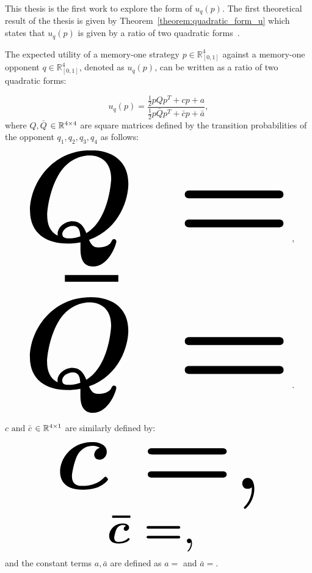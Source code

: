 This thesis is the first work to explore the form of \(u_q(p)\). The first
theoretical result of the thesis is given by
Theorem~\ref{theorem:quadratic_form_u} which states that \(u_q(p)\) is given by
a ratio of two quadratic forms~\cite{kepner2011}.

\begin{theorem}\label{theorem:quadratic_form_u}
    The expected utility of a memory-one strategy \(p\in\mathbb{R}_{[0,1]}^4\)
    against a memory-one opponent \(q\in\mathbb{R}_{[0,1]}^4\), denoted
    as \(u_q(p)\), can be written as a ratio of two quadratic forms:

    \begin{equation}\label{eq:optimisation_quadratic}
    u_q(p) = \frac{\frac{1}{2}pQp^T + cp + a}
                {\frac{1}{2}p\bar{Q}p^T + \bar{c}p + \bar{a}},
    \end{equation}
    where \(Q, \bar{Q}\) \(\in \mathbb{R}^{4\times4}\) are square matrices defined by the
    transition probabilities of the opponent \(q_1, q_2, q_3, q_4\) as follows:

    \begin{center}
    \begin{equation}
    \resizebox{0.91\linewidth}{!}{\arraycolsep=2.5pt%
    \boldmath\(
    Q = \)},
    \end{equation}
    \begin{equation}\label{eq:q_bar_matrix}
    \resizebox{0.91\linewidth}{!}{\arraycolsep=2.5pt%
    \boldmath\(
    \bar{Q} =  \)}.
    \end{equation}
    \end{center}

    \(c \text{ and } \bar{c}\) \(\in \mathbb{R}^{4 \times 1}\) are similarly defined by:

    \begin{equation}\label{eq:q_matrix_numerator}
    \resizebox{0.70\linewidth}{!}{\arraycolsep=2.5pt%
    \boldmath\(c = \),}
    \end{equation}
    \begin{equation}\label{eq:q_matrix_denominator}
    \resizebox{0.35\linewidth}{!}{\arraycolsep=2.5pt%
    \boldmath\(\bar{c} = \),
    }
    \end{equation}
    and the constant terms \(a, \bar{a}\) are defined as \(a = \) and
    \(\bar{a} = \).
\end{theorem}

